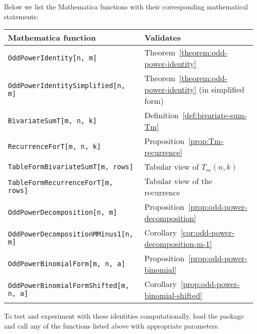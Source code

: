 Below we list the Mathematica functions with their corresponding mathematical statements:
\begin{center}
    \renewcommand{\arraystretch}{1.4}
    \begin{tabular}{ll}
        \toprule
        \textbf{Mathematica function}                 & \textbf{Validates}                                            \\
        \midrule
        \texttt{OddPowerIdentity[n, m]}               & Theorem~\ref{theorem:odd-power-identity}                      \\
        \texttt{OddPowerIdentitySimplified[n, m]}     & Theorem~\ref{theorem:odd-power-identity} (in simplified form) \\
        \texttt{BivariateSumT[m, n, k]}               & Definition~\ref{def:bivariate-sum-Tm}                         \\
        \texttt{RecurrenceForT[m, n, k]}              & Proposition~\ref{prop:Tm-recurrence}                          \\
        \texttt{TableFormBivariateSumT[m, rows]}      & Tabular view of $T_m(n,k)$                                    \\
        \texttt{TableFormRecurrenceForT[m, rows]}     & Tabular view of the recurrence                                \\
        \texttt{OddPowerDecomposition[n, m]}          & Proposition~\ref{prop:odd-power-decomposition}                \\
        \texttt{OddPowerDecompositionMMinus1[n, m]}   & Corollary~\ref{cor:odd-power-decomposition-m-1}               \\
        \texttt{OddPowerBinomialForm[m, n, a]}        & Proposition~\ref{prop:odd-power-binomial}                     \\
        \texttt{OddPowerBinomialFormShifted[m, n, a]} & Corollary~\ref{prop:odd-power-binomial-shifted}               \\
        \bottomrule
    \end{tabular}
\end{center}
To test and experiment with these identities computationally, load the package and call any of the
functions listed above with appropriate parameters.

